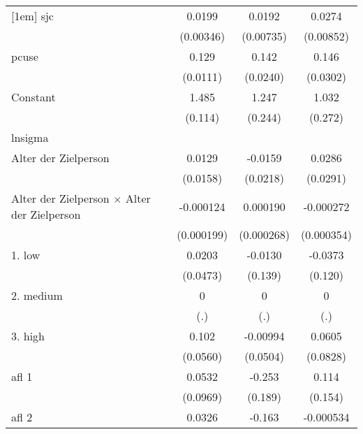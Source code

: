 {\begin{tabular}{l*{3}{c}}
[1em]
sjc                 &      0.0199\sym{***}&      0.0192\sym{**} &      0.0274\sym{**} \\
                    &   (0.00346)         &   (0.00735)         &   (0.00852)         \\
[1em]
pcuse               &       0.129\sym{***}&       0.142\sym{***}&       0.146\sym{***}\\
                    &    (0.0111)         &    (0.0240)         &    (0.0302)         \\
[1em]
Constant            &       1.485\sym{***}&       1.247\sym{***}&       1.032\sym{***}\\
                    &     (0.114)         &     (0.244)         &     (0.272)         \\
\hline
lnsigma             &                     &                     &                     \\
Alter der Zielperson&      0.0129         &     -0.0159         &      0.0286         \\
                    &    (0.0158)         &    (0.0218)         &    (0.0291)         \\
[1em]
Alter der Zielperson $\times$ Alter der Zielperson&   -0.000124         &    0.000190         &   -0.000272         \\
                    &  (0.000199)         &  (0.000268)         &  (0.000354)         \\
[1em]
1. low              &      0.0203         &     -0.0130         &     -0.0373         \\
                    &    (0.0473)         &     (0.139)         &     (0.120)         \\
[1em]
2. medium           &           0         &           0         &           0         \\
                    &         (.)         &         (.)         &         (.)         \\
[1em]
3. high             &       0.102         &    -0.00994         &      0.0605         \\
                    &    (0.0560)         &    (0.0504)         &    (0.0828)         \\
[1em]
afl 1               &      0.0532         &      -0.253         &       0.114         \\
                    &    (0.0969)         &     (0.189)         &     (0.154)         \\
[1em]
afl 2               &      0.0326         &      -0.163         &   -0.000534         \\

\end{tabular}}

